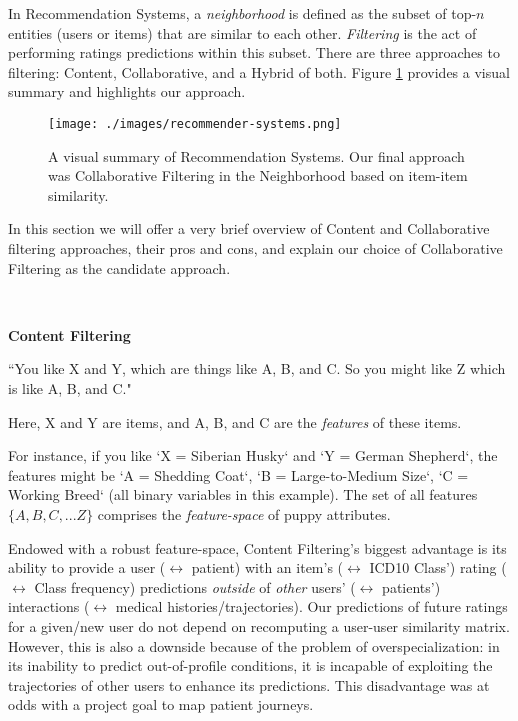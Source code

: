 \documentclass[twoside,11pt]{article}
\begin{document}
In Recommendation Systems, a \textit{neighborhood} is defined as the subset of top-$n$ entities (users or items) that are similar to each other. \textit{Filtering} is the act of performing ratings predictions within this subset. There are three approaches to filtering: Content, Collaborative, and a Hybrid of both. Figure \ref{fig:recommender-systems} provides a visual summary and highlights our approach.

\begin{figure}[H]
  \texttt{[image: ./images/recommender-systems.png]}
  \caption{A visual summary of Recommendation Systems. Our final approach was Collaborative Filtering in the Neighborhood based on item-item similarity.}
  \label{fig:recommender-systems}
\end{figure}

In this section we will offer a very brief overview of Content and Collaborative filtering approaches, their pros and cons, and explain our choice of Collaborative Filtering as the candidate approach.

\

\textbf{Content Filtering}

\vspace{2em}

\centerline{``You like X and Y, which are things like A, B, and C.
So you might like Z which is like A, B, and C."}

\vspace{1em}

Here, X and Y are items, and A, B, and C are the \textit{features} of these items.

For instance, if you like `X = Siberian Husky` and `Y = German Shepherd`, the features might be `A = Shedding Coat`, `B = Large-to-Medium Size`, `C = Working Breed` (all binary variables in this example). The set of all features $\{A, B, C,...Z\}$ comprises the \textit{feature-space} of puppy attributes.

Endowed with a robust feature-space, Content Filtering's biggest advantage is its ability to provide a user ($\leftrightarrow$ patient) with an item's ($\leftrightarrow$ ICD10 Class') rating ($\leftrightarrow$ Class frequency) predictions \textit{outside} of \textit{other} users' ($\leftrightarrow$ patients') interactions ($\leftrightarrow$ medical histories/trajectories). Our predictions of future ratings for a given/new user do not depend on recomputing a user-user similarity matrix. However, this is also a downside because of the problem of overspecialization: in its inability to predict out-of-profile conditions, it is incapable of exploiting the trajectories of other users to enhance its predictions. This disadvantage was at odds with a project goal to map patient journeys.
\end{document}
